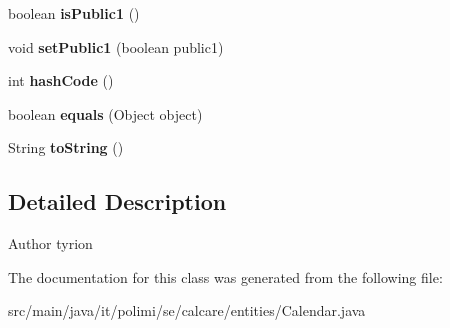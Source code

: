 \begin{DoxyCompactItemize}
\item 
\hypertarget{classit_1_1polimi_1_1se_1_1calcare_1_1entities_1_1Calendar_a3805c9ee047f832b106388fb3a31e4af}{}boolean {\bfseries is\+Public1} ()\label{classit_1_1polimi_1_1se_1_1calcare_1_1entities_1_1Calendar_a3805c9ee047f832b106388fb3a31e4af}

\item 
\hypertarget{classit_1_1polimi_1_1se_1_1calcare_1_1entities_1_1Calendar_a55c70c2a35e885e2d38ebe1fab062bb4}{}void {\bfseries set\+Public1} (boolean public1)\label{classit_1_1polimi_1_1se_1_1calcare_1_1entities_1_1Calendar_a55c70c2a35e885e2d38ebe1fab062bb4}

\item 
\hypertarget{classit_1_1polimi_1_1se_1_1calcare_1_1entities_1_1Calendar_a655824cdc3f1895f015870aa962b54bc}{}int {\bfseries hash\+Code} ()\label{classit_1_1polimi_1_1se_1_1calcare_1_1entities_1_1Calendar_a655824cdc3f1895f015870aa962b54bc}

\item 
\hypertarget{classit_1_1polimi_1_1se_1_1calcare_1_1entities_1_1Calendar_a64bb62df3fc9a5cd6bcc8db8afbbd1b4}{}boolean {\bfseries equals} (Object object)\label{classit_1_1polimi_1_1se_1_1calcare_1_1entities_1_1Calendar_a64bb62df3fc9a5cd6bcc8db8afbbd1b4}

\item 
\hypertarget{classit_1_1polimi_1_1se_1_1calcare_1_1entities_1_1Calendar_a262e85f6dcb926ca360d0e5c2d9c266c}{}String {\bfseries to\+String} ()\label{classit_1_1polimi_1_1se_1_1calcare_1_1entities_1_1Calendar_a262e85f6dcb926ca360d0e5c2d9c266c}

\end{DoxyCompactItemize}


\subsection{Detailed Description}
\begin{DoxyAuthor}{Author}
tyrion 
\end{DoxyAuthor}


The documentation for this class was generated from the following file\+:\begin{DoxyCompactItemize}
\item 
src/main/java/it/polimi/se/calcare/entities/Calendar.\+java\end{DoxyCompactItemize}
